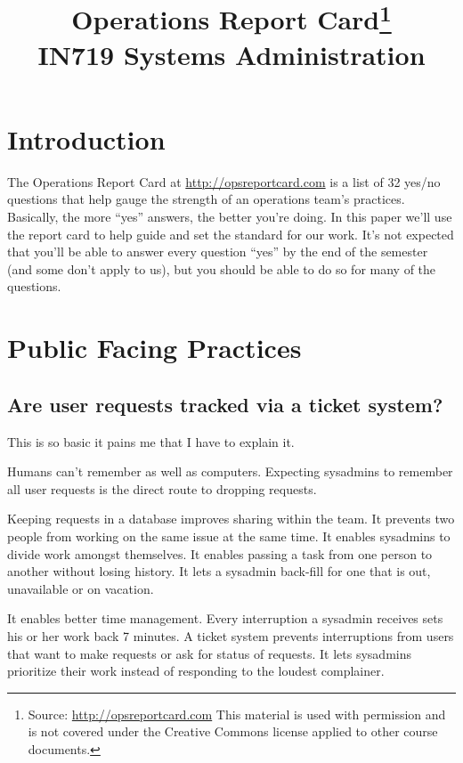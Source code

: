 \documentclass{article}
\begin{document}
\title{Operations Report Card\footnote{Source: \url{http://opsreportcard.com} This material is used with permission and is not covered under the Creative Commons license applied to other course documents.} \\ IN719 Systems Administration}
\date{}
\maketitle

\section*{Introduction}
The Operations Report Card at \url{http://opsreportcard.com} is a list of 32 yes/no questions that help gauge the strength of an operations team's practices. Basically, the more ``yes'' answers, the better you're doing. In this paper we'll use the report card to help guide and set the standard for our work. It's not expected that you'll be able to answer every question ``yes'' by the end of the semester (and some don't apply to us), but you should be able to do so for many of the questions.

\section{Public Facing Practices}

\subsection{Are user requests tracked via a ticket system?}
This is so basic it pains me that I have to explain it.

Humans can't remember as well as computers. Expecting sysadmins to remember all user requests is the direct route to dropping requests.

Keeping requests in a database improves sharing within the team. It prevents two people from working on the same issue at the same time. It enables sysadmins to divide work amongst themselves. It enables passing a task from one person to another without losing history. It lets a sysadmin back-fill for one that is out, unavailable or on vacation.

It enables better time management. Every interruption a sysadmin receives sets his or her work back 7 minutes. A ticket system prevents interruptions from users that want to make requests or ask for status of requests. It lets sysadmins prioritize their work instead of responding to the loudest complainer.
\end{document}
